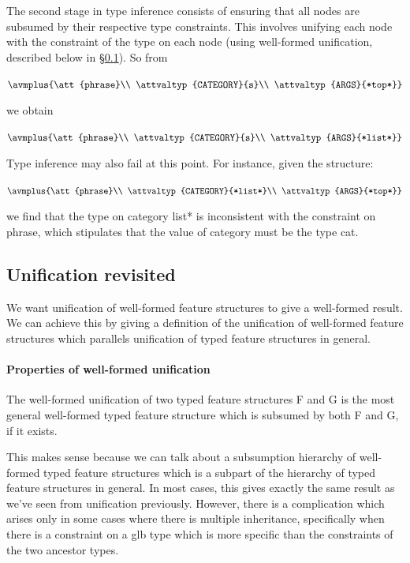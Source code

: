 \documentclass[12pt]{report}
\begin{document}
The second stage in type inference consists of ensuring that
all nodes are subsumed by their respective type constraints.
This involves unifying each node with the constraint 
of the type on each node (using
well-formed unification, described below in \S\ref{wfunif}).  So from
\begin{ex}
{\tiny $\avmplus{\att{phrase}\\
\attvaltyp{CATEGORY}{s}\\
\attvaltyp{ARGS}{*top*}}$}
\end{ex}
we obtain
\begin{ex}
{\tiny $\avmplus{\att{phrase}\\
\attvaltyp{CATEGORY}{s}\\
\attvaltyp{ARGS}{*list*}}$}
\end{ex}
Type inference may also fail at this point.  For instance, given
the structure:
\begin{ex}
{\tiny $\avmplus{\att{phrase}\\
\attvaltyp{CATEGORY}{*list*}\\
\attvaltyp{ARGS}{*top*}}$}
\end{ex}
we find that the type on {\feature category} {\type *list*} 
is inconsistent
with the constraint on {\type phrase},
which stipulates that the value of {\feature category} 
must be the type {\type cat}.


\subsection{Unification revisited}
\label{wfunif}

We want unification of well-formed feature structures to
give a well-formed result.
We can achieve this by giving a definition of the
unification of well-formed feature structures
which parallels unification of typed feature structures
in general.

\paragraph{Properties of well-formed unification}
The well-formed
unification of two typed feature structures F and G is the most general
well-formed typed feature structure which is subsumed by both F and G, if it
exists.

This makes sense because we can talk about a subsumption hierarchy
of well-formed typed feature structures which is a subpart of the
hierarchy of typed feature structures in general.
In most cases, this gives exactly the
same result as we've seen from unification previously.
However, there is a complication which arises only in some cases
where there is multiple inheritance, specifically 
when there is a constraint
on a glb type which is more specific than the constraints
of the two ancestor types. 
\end{document}
